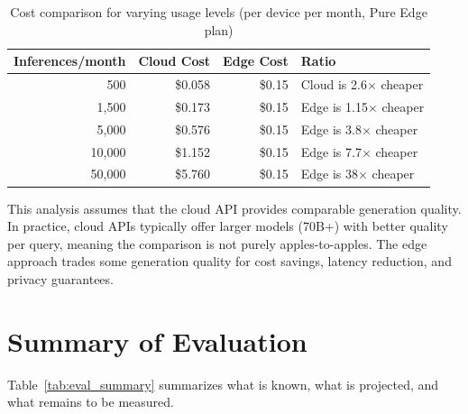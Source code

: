 \documentclass[12pt, letterpaper, twoside]{report}
\begin{document}
\begin{table}[H]
\centering
\caption{Cost comparison for varying usage levels (per device per month, Pure Edge plan)}
\label{tab:cost_comparison}
\begin{tabular}{@{}rrrl@{}}
\toprule
\textbf{Inferences/month} & \textbf{Cloud Cost} & \textbf{Edge Cost} & \textbf{Ratio} \\
\midrule
500 & \$0.058 & \$0.15 & Cloud is 2.6$\times$ cheaper \\
1{,}500 & \$0.173 & \$0.15 & Edge is 1.15$\times$ cheaper \\
5{,}000 & \$0.576 & \$0.15 & Edge is 3.8$\times$ cheaper \\
10{,}000 & \$1.152 & \$0.15 & Edge is 7.7$\times$ cheaper \\
50{,}000 & \$5.760 & \$0.15 & Edge is 38$\times$ cheaper \\
\bottomrule
\end{tabular}
\end{table}

This analysis assumes that the cloud API provides comparable generation quality. In practice, cloud APIs typically offer larger models (70B+) with better quality per query, meaning the comparison is not purely apples-to-apples. The edge approach trades some generation quality for cost savings, latency reduction, and privacy guarantees.

\section{Summary of Evaluation}
\label{sec:eval_summary}

Table~\ref{tab:eval_summary} summarizes what is known, what is projected, and what remains to be measured.
\end{document}
